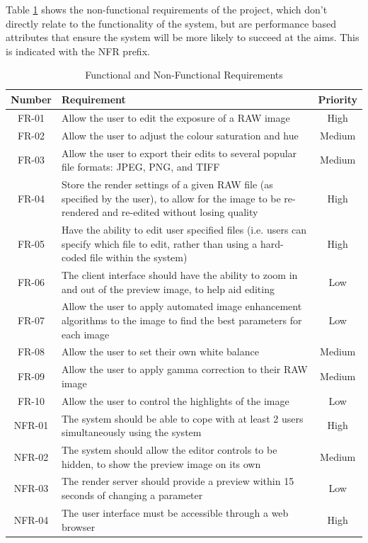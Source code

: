 \documentclass[12pt,a4paper]{article}
\begin{document}
Table \ref{RequirementsTable} shows the non-functional requirements of the project, which don't directly relate
to the functionality of the system, but are performance based attributes that ensure the system
will be more likely to succeed at the aims. This is indicated with the NFR prefix.

\begin{table}
  \centering
  \begin{tabular}{| c | p{12cm} | c |}
    \hline
    \textbf{Number} & \textbf{Requirement} & \textbf{Priority} \\
    \hline
    FR-01 & Allow the user to edit the exposure of a RAW image & High \\
    \hline
    FR-02 & Allow the user to adjust the colour saturation and hue & Medium \\
    \hline
    FR-03 & Allow the user to export their edits to several popular file formats: JPEG, PNG, and TIFF & Medium \\
    \hline
    FR-04 & Store the render settings of a given RAW file (as specified by the user), to allow for the image to be re-rendered and re-edited without losing quality & High \\
    \hline
    FR-05 & Have the ability to edit user specified files (i.e. users can specify which file to edit, rather than using a hard-coded file within the system) & High \\
    \hline
    FR-06 & The client interface should have the ability to zoom in and out of the preview image, to help aid editing & Low \\
    \hline
    FR-07 & Allow the user to apply automated image enhancement algorithms to the image to find the best parameters for each image & Low \\
    \hline
    FR-08 & Allow the user to set their own white balance & Medium\\
    \hline
    FR-09 & Allow the user to apply gamma correction to their RAW image & Medium\\
    \hline
    FR-10 & Allow the user to control the highlights of the image & Low\\
    \hline
    \hline
    NFR-01 & The system should be able to cope with at least 2 users simultaneously using the system & High \\
    \hline
    NFR-02 & The system should allow the editor controls to be hidden, to show the preview image on its own & Medium \\
    \hline
    NFR-03 & The render server should provide a preview within 15 seconds of changing a parameter & Low \\
    \hline
    NFR-04 & The user interface must be accessible through a web browser & High \\
    \hline
  \end{tabular}
  \caption{Functional and Non-Functional Requirements}
  \label{RequirementsTable}
\end{table}
\end{document}
